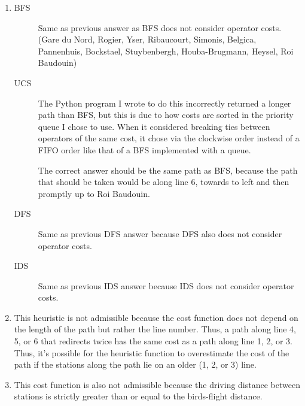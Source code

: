 \documentclass{article}
\begin{document}
\begin{enumerate}
\item %
    \begin{description}
        \item[BFS] Same as previous answer as BFS does not consider
            operator costs. (Gare du Nord, Rogier, Yser, Ribaucourt, Simonis, Belgica, Pannenhuis, Bockstael, Stuybenbergh, Houba-Brugmann, Heysel, Roi Baudouin)
        \item[UCS] The Python program I wrote to do this incorrectly
            returned a longer path than BFS, but this is
            due to how costs are sorted in the priority queue
            I chose to use. When it considered breaking ties
            between operators of the same cost, it chose via
            the clockwise order instead of a FIFO order
            like that of a BFS implemented with a queue.
            \par
            The correct answer should be the same path as BFS,
            because the path that should be taken would be along
            line 6, towards to left and then promptly up to
            Roi Baudouin.
        \item[DFS] Same as previous DFS answer because DFS also does not consider
            operator costs.
        \item[IDS] Same as previous IDS answer because IDS does not consider operator
            costs.
    \end{description}

\item %
    This heuristic is not admissible because the cost function does
    not depend on the length of the path but rather the line number.
    Thus, a path along line 4, 5, or 6 that redirects twice has the same cost as a path along line 1, 2, or 3. Thus, it's possible for the
    heuristic function to overestimate the cost of the path if the
    stations along the path lie on an older (1, 2, or 3) line.
    
\item %
    This cost function is also not admissible because the driving
    distance between stations is strictly greater than or equal
    to the birds-flight distance.
\end{enumerate}
\end{document}
